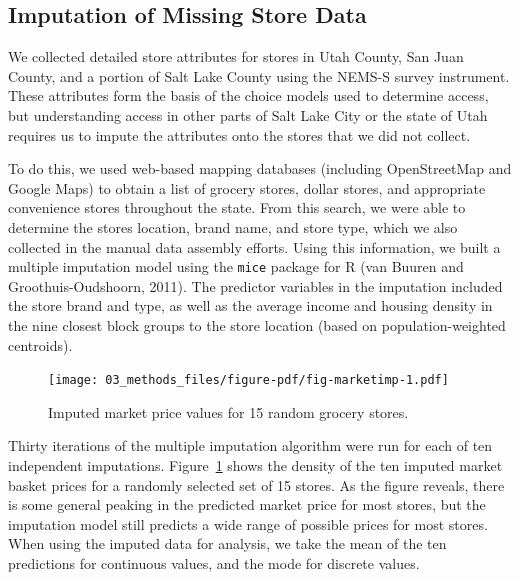 \documentclass[
  letterpaper,
  DIV=11,
  numbers=noendperiod]{scrreport}
\begin{document}
\hypertarget{imputation-of-missing-store-data}{%
\subsection{Imputation of Missing Store
Data}\label{imputation-of-missing-store-data}}

We collected detailed store attributes for stores in Utah County, San
Juan County, and a portion of Salt Lake County using the NEMS-S survey
instrument. These attributes form the basis of the choice models used to
determine access, but understanding access in other parts of Salt Lake
City or the state of Utah requires us to impute the attributes onto the
stores that we did not collect.

To do this, we used web-based mapping databases (including OpenStreetMap
and Google Maps) to obtain a list of grocery stores, dollar stores, and
appropriate convenience stores throughout the state. From this search,
we were able to determine the stores location, brand name, and store
type, which we also collected in the manual data assembly efforts. Using
this information, we built a multiple imputation model using the
\texttt{mice} package for R (van Buuren and Groothuis-Oudshoorn, 2011).
The predictor variables in the imputation included the store brand and
type, as well as the average income and housing density in the nine
closest block groups to the store location (based on population-weighted
centroids).

\begin{figure}[t]

{\centering \texttt{[image: 03\_methods\_files/figure-pdf/fig-marketimp-1.pdf]}

}

\caption{\label{fig-marketimp}Imputed market price values for 15 random
grocery stores.}

\end{figure}

Thirty iterations of the multiple imputation algorithm were run for each
of ten independent imputations. Figure~\ref{fig-marketimp} shows the
density of the ten imputed market basket prices for a randomly selected
set of 15 stores. As the figure reveals, there is some general peaking
in the predicted market price for most stores, but the imputation model
still predicts a wide range of possible prices for most stores. When
using the imputed data for analysis, we take the mean of the ten
predictions for continuous values, and the mode for discrete values.
\end{document}
